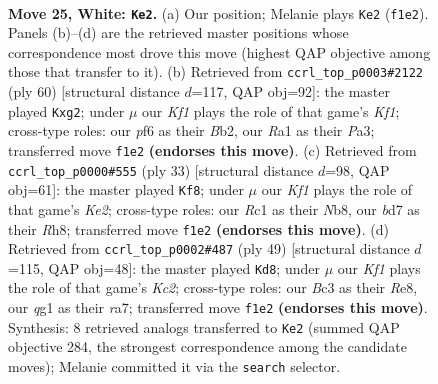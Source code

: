 \documentclass[11pt]{article}
\begin{document}
\clearpage

\begin{figure}[p]\centering
\begin{subfigure}{0.46\textwidth}\centering
\resizebox{\linewidth}{!}{%
\newchessgame
\chessboard[
  setfen={r3r3/1ppb2kp/5p2/p2p2b1/6P1/NPB1Pn2/P4P2/RNR2Kq1 w - - 2 25},
  showmover=false,
  pgfstyle=straightmove, color=movearrow, markmove={f1-e2}
]}
\caption{}
\end{subfigure}\hfill
\begin{subfigure}{0.46\textwidth}\centering
\resizebox{\linewidth}{!}{%
\newchessgame
\chessboard[
  setfen={2rr2k1/p5p1/3P3p/1p2Npb1/6n1/PP4P1/1B3Pq1/3RRK2 w - - 0 31},
  showmover=false,
  pgfstyle=straightmove, color=movearrow, markmove={f1-g2}
]}
\caption{}
\end{subfigure}
\\[4pt]
\begin{subfigure}{0.46\textwidth}\centering
\resizebox{\linewidth}{!}{%
\newchessgame
\chessboard[
  setfen={rn5r/p1p1kppp/1pb2n2/5N2/3B4/P1P2P2/2P2KBP/1R5R b - - 3 17},
  showmover=false,
  pgfstyle=straightmove, color=movearrow, markmove={e7-f8}
]}
\caption{}
\end{subfigure}\hfill
\begin{subfigure}{0.46\textwidth}\centering
\resizebox{\linewidth}{!}{%
\newchessgame
\chessboard[
  setfen={4r3/R1kn1p2/2pr1npp/1p1b2N1/5P2/1PB1P3/1P2BK1P/R7 b - - 3 25},
  showmover=false,
  pgfstyle=straightmove, color=movearrow, markmove={c7-d8}
]}
\caption{}
\end{subfigure}
\caption{\textbf{Move 25, White: \texttt{Ke2}.} (a) Our position; Melanie plays \texttt{Ke2} (\texttt{f1e2}). Panels (b)--(d) are the retrieved master positions whose correspondence most drove this move (highest QAP objective among those that transfer to it). (b) Retrieved from \texttt{ccrl\_top\_p0003\#2122} (ply 60) [structural distance $d$=117, QAP obj=92]: the master played \texttt{Kxg2}; under $\mu$ our \emph{Kf1} plays the role of that game's \emph{Kf1}; cross-type roles: our \emph{p}f6 as their \emph{B}b2, our \emph{R}a1 as their \emph{P}a3; transferred move \texttt{f1e2} \textbf{(endorses this move)}. (c) Retrieved from \texttt{ccrl\_top\_p0000\#555} (ply 33) [structural distance $d$=98, QAP obj=61]: the master played \texttt{Kf8}; under $\mu$ our \emph{Kf1} plays the role of that game's \emph{Ke2}; cross-type roles: our \emph{R}c1 as their \emph{N}b8, our \emph{b}d7 as their \emph{R}h8; transferred move \texttt{f1e2} \textbf{(endorses this move)}. (d) Retrieved from \texttt{ccrl\_top\_p0002\#487} (ply 49) [structural distance $d$=115, QAP obj=48]: the master played \texttt{Kd8}; under $\mu$ our \emph{Kf1} plays the role of that game's \emph{Kc2}; cross-type roles: our \emph{B}c3 as their \emph{R}e8, our \emph{q}g1 as their \emph{r}a7; transferred move \texttt{f1e2} \textbf{(endorses this move)}. Synthesis: 8 retrieved analogs transferred to \texttt{Ke2} (summed QAP objective 284, the strongest correspondence among the candidate moves); Melanie committed it via the \texttt{search} selector.}
\label{fig:thought-m48}
\end{figure}
\end{document}

